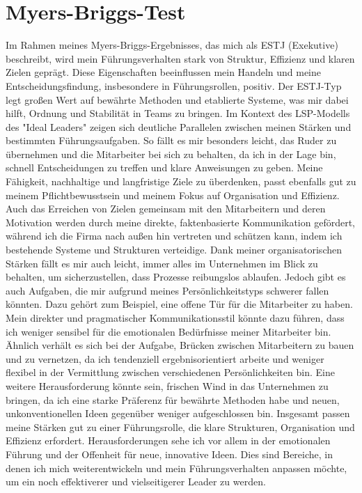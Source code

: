 \section{Myers-Briggs-Test}
Im Rahmen meines Myers-Briggs-Ergebnisses, das mich als ESTJ (Exekutive) beschreibt, wird mein Führungsverhalten stark von Struktur, Effizienz und klaren Zielen geprägt. Diese Eigenschaften beeinflussen mein Handeln und meine Entscheidungsfindung, insbesondere in Führungsrollen, positiv. Der ESTJ-Typ legt großen Wert auf bewährte Methoden und etablierte Systeme, was mir dabei hilft, Ordnung und Stabilität in Teams zu bringen.
Im Kontext des LSP-Modells des "Ideal Leaders" zeigen sich deutliche Parallelen zwischen meinen Stärken und bestimmten Führungsaufgaben. So fällt es mir besonders leicht, das Ruder zu übernehmen und die Mitarbeiter bei sich zu behalten, da ich in der Lage bin, schnell Entscheidungen zu treffen und klare Anweisungen zu geben. Meine Fähigkeit, nachhaltige und langfristige Ziele zu überdenken, passt ebenfalls gut zu meinem Pflichtbewusstsein und meinem Fokus auf Organisation und Effizienz. Auch das Erreichen von Zielen gemeinsam mit den Mitarbeitern und deren Motivation werden durch meine direkte, faktenbasierte Kommunikation gefördert, während ich die Firma nach außen hin vertreten und schützen kann, indem ich bestehende Systeme und Strukturen verteidige. Dank meiner organisatorischen Stärken fällt es mir auch leicht, immer alles im Unternehmen im Blick zu behalten, um sicherzustellen, dass Prozesse reibungslos ablaufen.
Jedoch gibt es auch Aufgaben, die mir aufgrund meines Persönlichkeitstyps schwerer fallen könnten. Dazu gehört zum Beispiel, eine offene Tür für die Mitarbeiter zu haben. Mein direkter und pragmatischer Kommunikationsstil könnte dazu führen, dass ich weniger sensibel für die emotionalen Bedürfnisse meiner Mitarbeiter bin. Ähnlich verhält es sich bei der Aufgabe, Brücken zwischen Mitarbeitern zu bauen und zu vernetzen, da ich tendenziell ergebnisorientiert arbeite und weniger flexibel in der Vermittlung zwischen verschiedenen Persönlichkeiten bin. Eine weitere Herausforderung könnte sein, frischen Wind in das Unternehmen zu bringen, da ich eine starke Präferenz für bewährte Methoden habe und neuen, unkonventionellen Ideen gegenüber weniger aufgeschlossen bin.
Insgesamt passen meine Stärken gut zu einer Führungsrolle, die klare Strukturen, Organisation und Effizienz erfordert. Herausforderungen sehe ich vor allem in der emotionalen Führung und der Offenheit für neue, innovative Ideen. Dies sind Bereiche, in denen ich mich weiterentwickeln und mein Führungsverhalten anpassen möchte, um ein noch effektiverer und vielseitigerer Leader zu werden.
\newpage